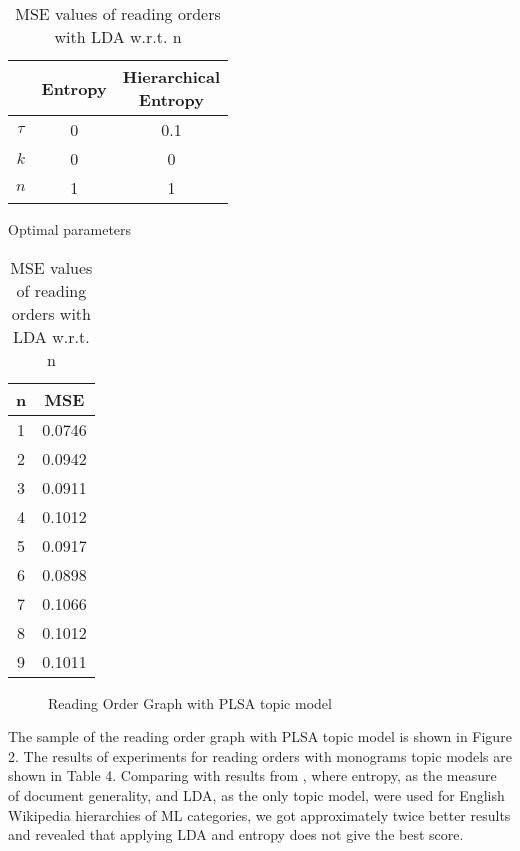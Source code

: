\documentclass[12pt,twoside]{article}
\begin{document}
	\begin{table}[H]
    \parbox{.40\linewidth}{
    \centering
    \begin{tabular}{|c|c|c|}
    \hline
     & Entropy & \specialcell{Hierarchical \\ Entropy}\\
    \hline
    $\tau$ & 0 & 0.1\\
    $k$ & 0 & 0\\
    $n$ & 1 & 1\\
    \hline
    \end{tabular}
    \caption{Optimal parameters}
    }
    \hfill
    \parbox{.60\linewidth}{
    \centering
    \begin{tabular}{|c|c|}
    \hline
    n & MSE \\
    \hline
    1 & 0.0746\\
    2 & 0.0942\\
    3 & 0.0911\\
    4 & 0.1012\\
    5 & 0.0917\\
    6 & 0.0898\\
    7 & 0.1066\\
    8 & 0.1012\\
    9 & 0.1011\\
    \hline
    \end{tabular}
    \caption{MSE values of reading orders with LDA w.r.t. n}
    }
    \end{table}
	
	\begin{figure}
    \centering
	\caption{Reading Order Graph with PLSA topic model}
	\end{figure}
	
	The sample of the reading order graph with PLSA topic model is shown in Figure 2. The results of experiments for reading orders with monograms topic models are shown in Table 4. Comparing with results from \cite{conf/icde/KoutrikaLS15}, where entropy, as the measure of document generality, and LDA, as the only topic model, were used for English Wikipedia hierarchies of ML categories, we got approximately twice better results and revealed that applying LDA and entropy does not give the best score.
    
\end{document}
